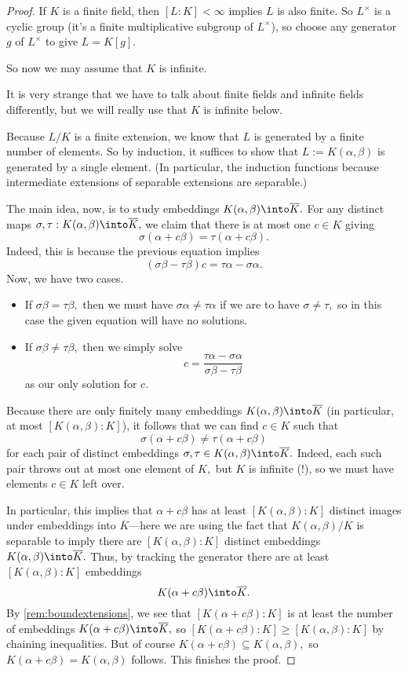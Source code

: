 \begin{proof}
	If $K$ is a finite field, then $[L:K]<\infty$ implies $L$ is also finite. So $L^\times$ is a cyclic group (it's a finite multiplicative subgroup of $L^\times$), so choose any generator $g$ of $L^\times$ to give $L=K[g].$

	So now we may assume that $K$ is infinite.
	\begin{remark}
		It is very strange that we have to talk about finite fields and infinite fields differently, but we will really use that $K$ is infinite below.
	\end{remark}
	Because $L/K$ is a finite extension, we know that $L$ is generated by a finite number of elements. So by induction, it suffices to show that $L:=K(\alpha,\beta)$ is generated by a single element. (In particular, the induction functions because intermediate extensions of separable extensions are separable.)
	
	The main idea, now, is to study embeddings $K(\alpha,\beta)\into\overline K.$ For any distinct maps $\sigma,\tau:K(\alpha,\beta)\into\overline K,$ we claim that there is at most one $c\in K$ giving
	\[\sigma(\alpha+c\beta)=\tau(\alpha+c\beta).\]
	Indeed, this is because the previous equation implies
	\[(\sigma\beta-\tau\beta)c=\tau\alpha-\sigma\alpha.\]
	Now, we have two cases.
	\begin{itemize}
		\item If $\sigma\beta=\tau\beta,$ then we must have $\sigma\alpha\ne\tau\alpha$ if we are to have $\sigma\ne\tau,$ so in this case the given equation will have no solutions.
		\item If $\sigma\beta\ne\tau\beta,$ then we simply solve
		\[c=\frac{\tau\alpha-\sigma\alpha}{\sigma\beta-\tau\beta}\]
		as our only solution for $c.$
	\end{itemize}
	Because there are only finitely many embeddings $K(\alpha,\beta)\into\overline K$ (in particular, at most $[K(\alpha,\beta):K]$), it follows that we can find $c\in K$ such that
	\[\sigma(\alpha+c\beta)\ne\tau(\alpha+c\beta)\]
	for each pair of distinct embeddings $\sigma,\tau\in K(\alpha,\beta)\into\overline K.$ Indeed, each such pair throws out at most one element of $K,$ but $K$ is infinite (!), so we must have elements $c\in K$ left over.

	In particular, this implies that $\alpha+c\beta$ has at least $[K(\alpha,\beta):K]$ distinct images under embeddings into $\overline K$---here we are using the fact that $K(\alpha,\beta)/K$ is separable to imply there are $[K(\alpha,\beta):K]$ distinct embeddings $K(\alpha,\beta)\into\overline K.$ Thus, by tracking the generator there are at least $[K(\alpha,\beta):K]$ embeddings
	\[K(\alpha+c\beta)\into\overline K.\]
	By \autoref{rem:boundextensions}, we see that $[K(\alpha+c\beta):K]$ is at least the number of embeddings $K(\alpha+c\beta)\into\overline K,$ so $[K(\alpha+c\beta):K]\ge[K(\alpha,\beta):K]$ by chaining inequalities. But of course $K(\alpha+c\beta)\subseteq K(\alpha,\beta),$ so $K(\alpha+c\beta)=K(\alpha,\beta)$ follows. This finishes the proof.
\end{proof}

